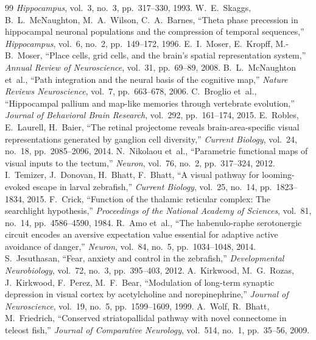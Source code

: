 \documentclass[11pt,a4paper]{article}
\begin{document}
\begin{thebibliography}{99}
  \textit{Hippocampus}, vol.~3, no.~3, pp.~317--330, 1993.
  W.~E.~Skaggs, B.~L.~McNaughton, M.~A.~Wilson, C.~A.~Barnes,
  ``Theta phase precession in hippocampal neuronal populations and the compression of temporal sequences,''
  \textit{Hippocampus}, vol.~6, no.~2, pp.~149--172, 1996.
  E.~I.~Moser, E.~Kropff, M.-B.~Moser,
  ``Place cells, grid cells, and the brain's spatial representation system,''
  \textit{Annual Review of Neuroscience}, vol.~31, pp.~69--89, 2008.
  B.~L.~McNaughton et~al.,
  ``Path integration and the neural basis of the cognitive map,''
  \textit{Nature Reviews Neuroscience}, vol.~7, pp.~663--678, 2006.
  C.~Broglio et~al.,
  ``Hippocampal pallium and map-like memories through vertebrate evolution,''
  \textit{Journal of Behavioral Brain Research}, vol.~292, pp.~161--174, 2015.
  E.~Robles, E.~Laurell, H.~Baier,
  ``The retinal projectome reveals brain-area-specific visual representations generated by ganglion cell diversity,''
  \textit{Current Biology}, vol.~24, no.~18, pp.~2085--2096, 2014.
  N.~Nikolaou et~al.,
  ``Parametric functional maps of visual inputs to the tectum,''
  \textit{Neuron}, vol.~76, no.~2, pp.~317--324, 2012.
  I.~Temizer, J.~Donovan, H.~Bhatt, F.~Bhatt,
  ``A visual pathway for looming-evoked escape in larval zebrafish,''
  \textit{Current Biology}, vol.~25, no.~14, pp.~1823--1834, 2015.
  F.~Crick,
  ``Function of the thalamic reticular complex: The searchlight hypothesis,''
  \textit{Proceedings of the National Academy of Sciences}, vol.~81, no.~14, pp.~4586--4590, 1984.
  R.~Amo et~al.,
  ``The habenulo-raphe serotonergic circuit encodes an aversive expectation value essential for adaptive active avoidance of danger,''
  \textit{Neuron}, vol.~84, no.~5, pp.~1034--1048, 2014.
  S.~Jesuthasan,
  ``Fear, anxiety and control in the zebrafish,''
  \textit{Developmental Neurobiology}, vol.~72, no.~3, pp.~395--403, 2012.
  A.~Kirkwood, M.~G.~Rozas, J.~Kirkwood, F.~Perez, M.~F.~Bear,
  ``Modulation of long-term synaptic depression in visual cortex by acetylcholine and norepinephrine,''
  \textit{Journal of Neuroscience}, vol.~19, no.~5, pp.~1599--1609, 1999.
  A.~Wolf, R.~Bhatt, M.~Friedrich,
  ``Conserved striatopallidal pathway with novel connectome in teleost fish,''
  \textit{Journal of Comparative Neurology}, vol.~514, no.~1, pp.~35--56, 2009.

\end{thebibliography}
\end{document}
